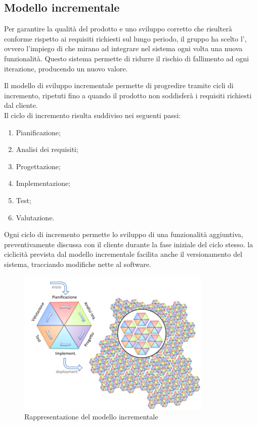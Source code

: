 \documentclass[../piano_di_progetto.tex]{subfiles}
\begin{document}
\subsection{Modello incrementale}
\label{sub:incr}

Per garantire la qualità del prodotto e uno sviluppo corretto che risulterà conforme rispetto ai requisiti richiesti sul lungo periodo, il gruppo ha scelto l’, ovvero l’impiego di  che mirano ad integrare nel sistema ogni volta una nuova funzionalità. Questo sistema permette di ridurre il rischio di fallimento ad ogni iterazione, producendo un nuovo valore.

Il modello di sviluppo incrementale permette di progredire tramite cicli di incremento, 
ripetuti fino a quando il prodotto non soddisferà i requisiti richiesti dal cliente. \\
Il ciclo di incremento risulta suddiviso nei seguenti passi:
\begin{enumerate}
    \item Pianificazione;
    \item Analisi dei requisiti;
    \item Progettazione;
    \item Implementazione;
    \item Test;
    \item Valutazione.
\end{enumerate}
Ogni ciclo di incremento permette lo sviluppo di una funzionalità aggiuntiva,
preventivamente discussa con il cliente durante la fase iniziale del ciclo stesso.
la ciclicità prevista dal modello incrementale facilita anche il versionamento del sistema,
tracciando modifiche nette al software.

\begin{figure}[H]
    \centering
    \includegraphics[scale = 0.6]{src/img/modello_incrementale.png}
    \caption{Rappresentazione del modello incrementale}
    \label{fig:logo}
\end{figure}
\end{document}
